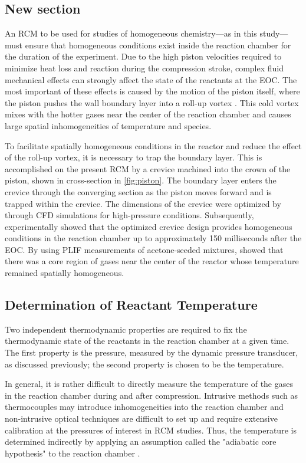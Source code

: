\documentclass[12pt, letterpaper]{article}
\begin{document}
\subsection{New section}

An RCM to be used for studies of homogeneous chemistry---as in this study---%
must ensure that homogeneous conditions exist inside the reaction
chamber for the duration of the experiment. Due to the high piston
velocities required to minimize heat loss and reaction during the
compression stroke, complex fluid mechanical effects can strongly
affect the state of the reactants at the EOC. The most important of these
effects is caused by the motion of the piston itself, where the piston
pushes the wall boundary layer into a roll-up vortex \cite{Lee1998}.
This cold vortex mixes with the hotter gases near the center of
the reaction chamber and causes large spatial inhomogeneities of
temperature and species.

To facilitate spatially homogeneous conditions in the reactor
and reduce the effect of the roll-up vortex, it is necessary to trap
the boundary layer. This is accomplished on the present RCM by a
crevice machined into the crown of the piston, shown in cross-section
in \autoref{fig:piston}. The boundary layer enters the crevice through
the converging section as the piston moves forward and is trapped
within the crevice. The dimensions of the crevice were optimized
by \textcite{Mitall2006a} through CFD simulations for high-pressure
conditions. Subsequently, \textcite{Mittal2006b} experimentally showed that
the optimized crevice design provides homogeneous conditions in the
reaction chamber up to approximately 150 milliseconds after the EOC.
By using PLIF measurements of acetone-seeded mixtures,
\textcite{Mittal2006b} showed that there was a core region of gases
near the center of the reactor whose temperature remained spatially
homogeneous.

\subsection{Determination of Reactant Temperature}

Two independent thermodynamic properties are required to fix the
thermodynamic state of the reactants in the reaction chamber at a
given time. The first property is the pressure, measured by the dynamic
pressure transducer, as discussed previously; the second property
is chosen to be the temperature.

In general, it is rather difficult to directly measure the temperature
of the gases in the reaction chamber during and after compression.
Intrusive methods such as thermocouples may introduce inhomogeneities into
the reaction chamber and non-intrusive optical techniques are difficult to set up
and require extensive calibration at the pressures of interest in RCM
studies. Thus, the temperature is determined indirectly by applying an
assumption called the "adiabatic core hypothesis" to the reaction chamber
\cite{Mittal2007, Lee1998}.
\end{document}
